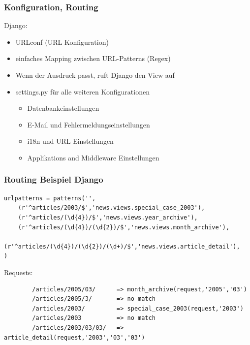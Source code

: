 \documentclass[
    t,
    smaller,
    compress,
]{beamer}
\begin{document}
\begin{frame}
  \frametitle{Konfiguration, Routing}
	Django:
  	\begin{itemize}[<1->]
    	\item URLconf (URL Konfiguration)
    	\item einfaches Mapping zwischen URL-Patterns (Regex)
    	\item Wenn der Ausdruck passt, ruft Django den View auf
    	\item settings.py für alle weiteren Konfigurationen
    	\begin{itemize}[<1->]
    		\item Datenbankeinstellungen
    		\item E-Mail und Fehlermeldungseinstellungen
    		\item i18n und URL Einstellungen
    		\item Applikations and Middleware Einstellungen
    	\end{itemize}
  	 \end{itemize}
  	 
\end{frame}
\begin{frame}[fragile]
\frametitle{Routing Beispiel Django}
\begin{lstlisting}
urlpatterns = patterns('',
	(r'^articles/2003/$','news.views.special_case_2003'),
	(r'^articles/(\d{4})/$','news.views.year_archive'),
	(r'^articles/(\d{4})/(\d{2})/$','news.views.month_archive'),
	(r'^articles/(\d{4})/(\d{2})/(\d+)/$','news.views.article_detail'),
)
\end{lstlisting}
	Requests:
	\begin{lstlisting}
		/articles/2005/03/		=> month_archive(request,'2005','03')
		/articles/2005/3/		=> no match
		/articles/2003/			=> special_case_2003(request,'2003')
		/articles/2003			=> no match
		/articles/2003/03/03/	=> article_detail(request,'2003','03','03')
	\end{lstlisting}
\end{frame}
\end{document}
